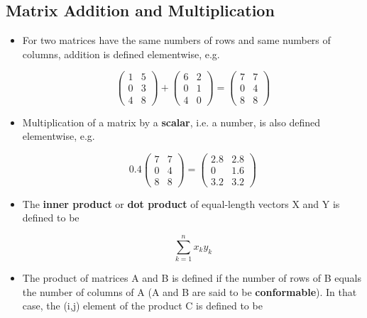 \subsection{Matrix Addition and Multiplication}

\begin{itemize}

\item For two matrices have the same numbers of rows and same numbers of
columns, addition is defined elementwise, e.g.

\begin{equation}
\left (
\begin{array}{cc}
1 & 5 \\
0 & 3 \\
4 & 8 
\end{array}
\right ) +
\left (
\begin{array}{cc}
6 & 2 \\
0 & 1 \\
4 & 0 
\end{array}
\right ) =
\left (
\begin{array}{cc}
7 & 7 \\
0 & 4 \\
8 & 8 
\end{array}
\right ) 
\end{equation}

\item Multiplication of a matrix by a {\bf scalar}, i.e. a number, is also
defined elementwise, e.g.

\begin{equation}
0.4 \left (
\begin{array}{cc}
7 & 7 \\
0 & 4 \\
8 & 8 
\end{array}
\right ) =
\left (
\begin{array}{cc}
2.8 & 2.8 \\
0 & 1.6 \\
3.2 & 3.2 
\end{array}
\right ) 
\end{equation}

\item The {\bf inner product} or {\bf dot product} of equal-length vectors X
and Y is defined to be

\begin{equation}
\sum_{k=1}^n x_k y_k
\end{equation}

\item The product of matrices A and B is defined if the number of rows
of B equals the number of columns of A (A and B are said to be {\bf
conformable}).  In that case, the (i,j) element of the product C is
defined to be


\end{itemize}
